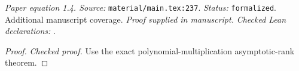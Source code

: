 \noindent\textit{Paper equation 1.4. Source:} \texttt{material/main.tex:237}.
\textit{Status:} \texttt{formalized}. Additional manuscript coverage.
\textit{Proof supplied in manuscript.}
\textit{Checked Lean declarations:} .

\begin{proof}
\leanok
{}
\textit{Checked proof.} Use the exact polynomial-multiplication asymptotic-rank theorem.
\end{proof}

